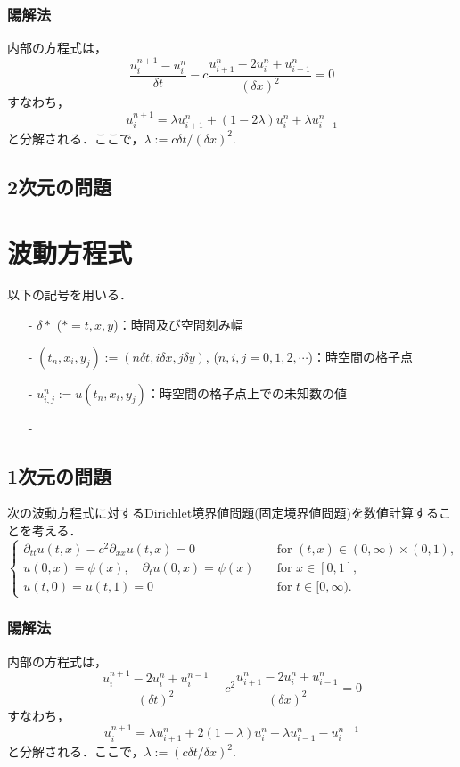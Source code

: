 \subsubsection{陽解法}
内部の方程式は，
$$
\frac{u^{n+1}_{i}-u^{n}_{i}}{\delta t}-c\frac{u^{n}_{i+1}-2u^{n}_{i}+u^{n}_{i-1}}{(\delta x)^{2}}=0
$$
すなわち，
$$
u^{n+1}_{i}=\lambda u^{n}_{i+1}+(1-2\lambda)u^{n}_{i}+\lambda u^{n}_{i-1}
$$
と分解される．ここで，$\lambda:=c\delta t/(\delta x)^{2}$.


\subsection{ 2次元の問題}



\section{波動方程式}
以下の記号を用いる．
\begin{itemize}
\item[-] $\delta \ast$ ($\ast=t,x,y$)：時間及び空間刻み幅
\item[-] $(t_n ,x_i ,y_j):=(n \delta t,i \delta x,j \delta y)$, ($n,i,j=0,1,2,\cdots$)：時空間の格子点
\item[-] $u^{n}_{i,j}:=u(t_n, x_i, y_j)$：時空間の格子点上での未知数の値
\item[-]  
\end{itemize}

\subsection{ 1次元の問題}
次の波動方程式に対するDirichlet境界値問題(固定境界値問題)を数値計算することを考える．
\begin{equation}
\label{e:wave1d}
	\begin{cases}
		\partial_{tt}u(t,x)-c^{2}\partial_{xx}u(t,x)=0\quad&\text{for $(t,x)\in(0,\infty)\times(0,1)$,}\\
		u(0,x)=\phi(x),\quad \partial_{t}u(0,x)=\psi(x)\quad&\text{for $x\in[0,1]$,}\\
		u(t,0)=u(t,1)=0\quad&\text{for $t\in[0,\infty)$.}
	\end{cases}
\end{equation}

\subsubsection{陽解法}
内部の方程式は，
$$
\frac{u^{n+1}_{i}-2u^{n}_{i}+u^{n-1}_{i}}{(\delta t)^{2}}-c^{2}\frac{u^{n}_{i+1}-2u^{n}_{i}+u^{n}_{i-1}}{(\delta x)^{2}}=0
$$
すなわち，
$$
u^{n+1}_{i}=\lambda u^{n}_{i+1}+2(1-\lambda)u^{n}_{i}+\lambda u^{n}_{i-1}-u^{n-1}_{i}
$$
と分解される．ここで，$\lambda:=(c\delta t/\delta x)^{2}$.

